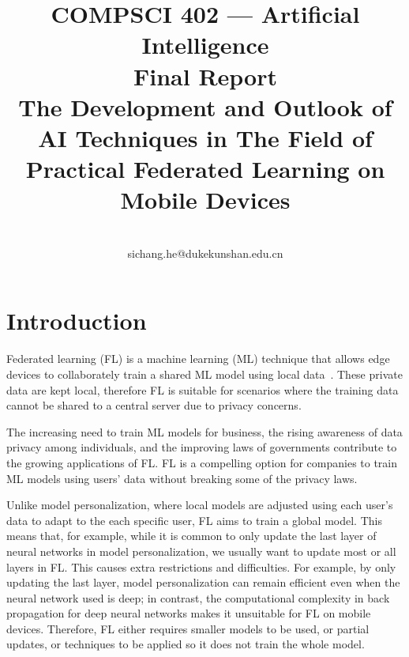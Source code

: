 \documentclass[conference]{IEEEtran}
\begin{document}
\title{
    COMPSCI 402 --- Artificial Intelligence\\
    Final Report\\
    The Development and Outlook of AI Techniques in The Field of
    Practical Federated Learning on Mobile Devices
}

\author{
    \\
    sichang.he@dukekunshan.edu.cn
}

\maketitle

\begin{abstract}
\end{abstract}

\section{Introduction}



Federated learning (FL) is a machine learning (ML) technique that
allows edge devices to collaborately train a shared ML model using
local data~\cite{bonawitz2019towards}.
These private data are kept local,
therefore FL is suitable for scenarios where
the training data cannot be shared to a central server due to privacy concerns.

The increasing need to train ML models for business,
the rising awareness of data privacy among individuals,
and the improving laws of governments contribute to
the growing applications of FL.
FL is a compelling option for companies to train ML models using users' data
without breaking some of the privacy laws.

Unlike model personalization,
where local models are adjusted using each user's data to
adapt to the each specific user,
FL aims to train a global model.
This means that, for example,
while it is common to only update the last layer of neural networks in
model personalization,
we usually want to update most or all layers in FL.
This causes extra restrictions and difficulties.
For example, by only updating the last layer,
model personalization can remain efficient even when
the neural network used is deep;
in contrast, the computational complexity in back propagation for
deep neural networks makes it unsuitable for FL on mobile devices.
Therefore, FL either requires smaller models to be used,
or partial updates,
or techniques to be applied so it does not train the whole model.
\end{document}
